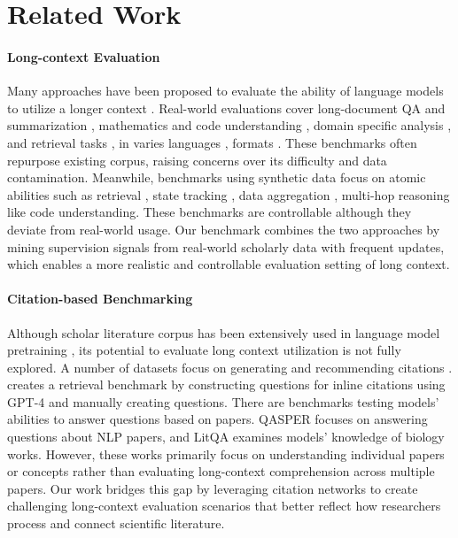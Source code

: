 \section{Related Work}
\label{related_work}

\paragraph{Long-context Evaluation} Many approaches have been proposed to evaluate the ability of language models to utilize a longer context \citep{inftybench,loogle,bamboo,wang2024leavedocumentbehindbenchmarking,song2024countingstarsmultievidencepositionawarescalable}. Real-world evaluations cover long-document QA and summarization \citep{zeroscrolls,laban2024summaryhaystackchallengelongcontext}, mathematics and code understanding \citep{leval,zhao2024docmathevalevaluatingmathreasoning,wang2024mathhayautomatedbenchmarklongcontext}, domain specific analysis \citep{reddy-etal-2024-docfinqa}, and retrieval tasks \citep{helmet}, in varies languages \cite{qiu2024clongevalchinesebenchmarkevaluating}, formats \citep{zhang2024marathonracerealmlong}. 
These benchmarks often repurpose existing corpus, raising concerns over its difficulty and data contamination. Meanwhile, benchmarks using synthetic data focus on atomic abilities such as retrieval \citep{needle}, state tracking \cite{babilong}, data aggregation \citep{ruler}, multi-hop reasoning \citep{longbench} like code understanding. These benchmarks are controllable although they deviate from real-world usage. Our benchmark combines the two approaches by mining supervision signals from real-world scholarly data with frequent updates, which enables a more realistic and controllable evaluation setting of long context.    


\paragraph{Citation-based Benchmarking} Although scholar literature corpus has been extensively used in language model pretraining \citep{s2orc, pile}, its potential to evaluate long context utilization is not fully explored. A number of datasets focus on generating and recommending citations \citep{citebench, F_rber_2020, 10.1007/978-3-030-99736-6_19}. \citet{litsearch} creates a retrieval benchmark by constructing questions for inline citations using GPT-4 and manually creating questions. There are benchmarks testing models' abilities to answer questions based on papers.  QASPER \citep{qasper} focuses on answering questions about NLP papers, and LitQA \citep{Lala2023PaperQA} examines models' knowledge of biology works.  However, these works primarily focus on understanding individual papers or concepts rather than evaluating long-context comprehension across multiple papers. Our work bridges this gap by leveraging citation networks to create challenging long-context evaluation scenarios that better reflect how researchers process and connect scientific literature.